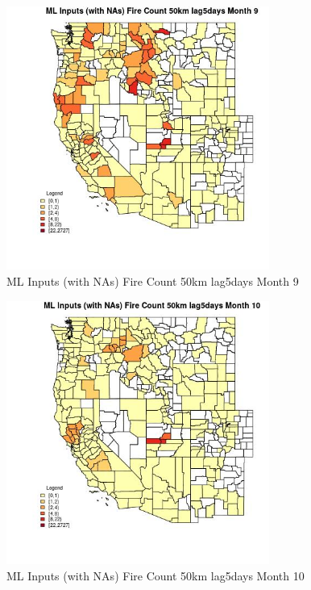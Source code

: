 \clearpage 

\begin{figure} 
\centering  
\includegraphics[width=0.77\textwidth]{Code_Outputs/Report_ML_input_PM25_Step4_part_f_de_duplicated_aveswNAs_CountyFire_Count_50km_lag5daysmedianMonth9.jpg} 
\caption{\label{fig:Report_ML_input_PM25_Step4_part_f_de_duplicated_aveswNAsCountyFire_Count_50km_lag5daysmedianMonth9}ML Inputs (with NAs) Fire Count 50km lag5days Month 9} 
\end{figure} 
 

\begin{figure} 
\centering  
\includegraphics[width=0.77\textwidth]{Code_Outputs/Report_ML_input_PM25_Step4_part_f_de_duplicated_aveswNAs_CountyFire_Count_50km_lag5daysmedianMonth10.jpg} 
\caption{\label{fig:Report_ML_input_PM25_Step4_part_f_de_duplicated_aveswNAsCountyFire_Count_50km_lag5daysmedianMonth10}ML Inputs (with NAs) Fire Count 50km lag5days Month 10} 
\end{figure} 
 

